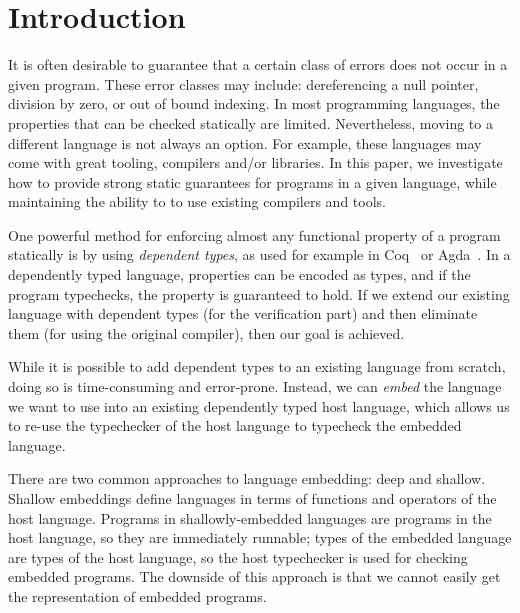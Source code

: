 \documentclass[sigplan,screen]{acmart}
\begin{document}
\section{Introduction}\label{sec:introduction}

It is often desirable to guarantee that a
certain class of errors does not occur in a given program.  These
error classes may include: dereferencing a null pointer, division
by zero, or out of bound indexing.  In most
programming languages, the properties that can be checked
statically are limited.  Nevertheless, moving to a different
language is not always an option.  For example, these languages may
come with great tooling, compilers and/or libraries.  In this paper, we
investigate how to provide strong static guarantees for programs in a
given language, while maintaining the ability to to use existing
compilers and tools.

One powerful method for enforcing almost any functional property of a
program statically is by using \emph{dependent types}, as used for
example in Coq~\cite{Coq-8-13-2} or Agda~\cite{agda-2-6-2}.  In a
dependently typed language, properties can be encoded as types, and if
the program typechecks, the property is guaranteed to hold.  If we
extend our existing language with dependent types (for the verification
part) and then eliminate them (for using the original compiler), then
our goal is achieved.

While it is possible to add dependent types to an existing language
from scratch, doing so is time-consuming and error-prone.  Instead,
we can \emph{embed} the language we want to use into an existing
dependently typed host language, which allows us to re-use the typechecker
of the host language to typecheck the embedded language.

There are two common approaches to language embedding: deep and shallow.
Shallow embeddings define languages in terms of functions and operators
of the host language.  Programs in shallowly-embedded languages are programs
in the host language, so they are immediately run\-nable; types of the embedded
language are types of the host language, so the host typechecker is used for
checking embedded programs.  The downside of this approach is that we cannot
easily get the representation of embedded programs.
\end{document}
